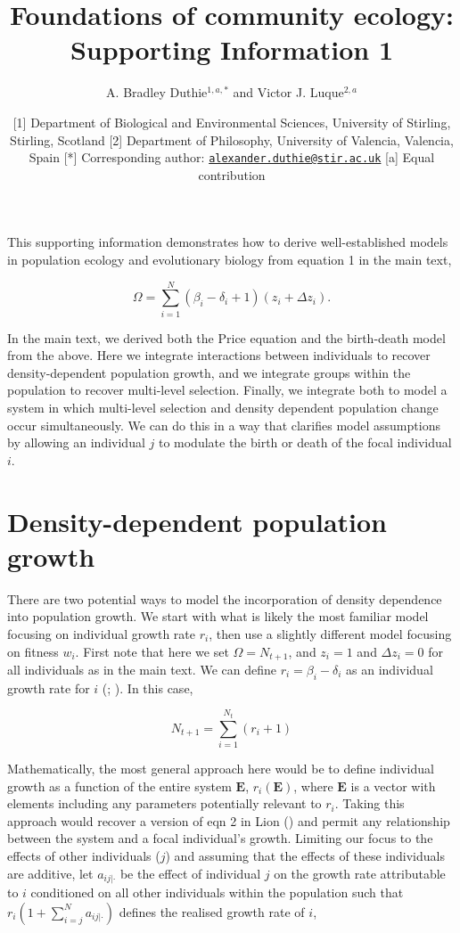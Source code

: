 \documentclass[
]{article}
\title{Foundations of community ecology: Supporting Information 1}
\author{A. Bradley Duthie\(^{1,a,*}\) and Victor J. Luque\(^{2,a}\)}
\date{{[}1{]} Department of Biological and Environmental Sciences,
University of Stirling, Stirling, Scotland {[}2{]} Department of
Philosophy, University of Valencia, Valencia, Spain {[}*{]}
Corresponding author:
\href{mailto:alexander.duthie@stir.ac.uk}{\nolinkurl{alexander.duthie@stir.ac.uk}}
{[}a{]} Equal contribution}
\begin{document}
\maketitle

This supporting information demonstrates how to derive well-established
models in population ecology and evolutionary biology from equation 1 in
the main text,

\[\Omega = \sum_{i=1}^{N} \left(\beta_{i} - \delta_{i} + 1 \right)\left(z_{i} + \Delta z_{i} \right).
\tag{1}
\]

In the main text, we derived both the Price equation and the birth-death
model from the above. Here we integrate interactions between individuals
to recover density-dependent population growth, and we integrate groups
within the population to recover multi-level selection. Finally, we
integrate both to model a system in which multi-level selection and
density dependent population change occur simultaneously. We can do this
in a way that clarifies model assumptions by allowing an individual
\(j\) to modulate the birth or death of the focal individual \(i\).

\section{Density-dependent population
growth}\label{density-dependent-population-growth}

There are two potential ways to model the incorporation of density
dependence into population growth. We start with what is likely the most
familiar model focusing on individual growth rate \(r_{i}\), then use a
slightly different model focusing on fitness \(w_{i}\). First note that
here we set \(\Omega = N_{t+1}\), and \(z_{i} = 1\) and
\(\Delta z_{i} = 0\) for all individuals as in the main text. We can
define \(r_{i} = \beta_{i} - \delta_{i}\) as an individual growth rate
for \(i\) (;
). In this case,

\[N_{t+1} = \sum_{i=1}^{N_{t}}\left(r_{i} + 1\right)
\tag{S1}
\]

Mathematically, the most general approach here would be to define
individual growth as a function of the entire system \(\mathbf{E}\),
\(r_{i}(\mathbf{E})\), where \(\mathbf{E}\) is a vector with elements
including any parameters potentially relevant to \(r_{i}\). Taking this
approach would recover a version of eqn 2 in Lion
() and permit any relationship between the
system and a focal individual's growth. Limiting our focus to the
effects of other individuals (\(j\)) and assuming that the effects of
these individuals are additive, let \(a_{ij|\cdot}\) be the effect of
individual \(j\) on the growth rate attributable to \(i\) conditioned on
all other individuals within the population such that
\(r_{i}\left(1 + \sum_{i = j}^{N}a_{ij|\cdot} \right)\) defines the
realised growth rate of \(i\),
\end{document}
